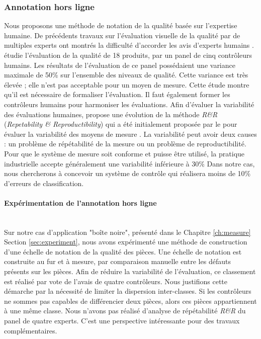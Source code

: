 \subsubsection{Annotation hors ligne}
Nous proposons une méthode de notation de la qualité basée sur l'expertise humaine.
De précédents travaux sur l'évaluation visuelle de la qualité par de multiples experts ont montrés la difficulté d'accorder les avis d'experts humains \cite{baudet_visual_2011}.
\citeauthor{baudet_visual_2011} étudie l'évaluation de la qualité de 18 produits, par un panel de cinq contrôleurs humains.
Les résultats de l'évaluation de ce panel possédaient une variance maximale de 50\% sur l'ensemble des niveaux de qualité.
Cette variance est très élevée ; elle n'est pas acceptable pour un moyen de mesure.
Cette étude montre qu'il est nécessaire de formaliser l'évaluation.
Il faut également former les contrôleurs humains pour harmoniser les évaluations.
Afin d'évaluer la variabilité des évaluations humaines,  \citeauthor{baudet_maitrise_2012} \cite{baudet_maitrise_2012} propose une évolution de la méthode \textit{R\&R} (\textit{Repetability \& Reproductibility}) qui a été initialement proposée par le \citeauthor{automotiveindustryactiongroup_measurement_2010} pour évaluer la variabilité des moyens de mesure \cite{automotiveindustryactiongroup_measurement_2010}.
La variabilité peut avoir deux causes : un problème de répétabilité de la mesure ou un problème de reproductibilité.
Pour que le système de mesure soit conforme et puisse être utilisé, la pratique industrielle accepte généralement une variabilité inférieure à 30\%
Dans notre cas, nous chercherons à concevoir un système de contrôle qui réalisera moins de 10\% d'erreurs de classification.

\paragraph{Expérimentation de l'annotation hors ligne}\mbox{} \label{parag:offline_annotation} \\
Sur notre cas d'application "boîte noire", présenté dans le Chapitre \ref{ch:measure} Section \ref{sec:experiment}, nous avons expérimenté une méthode de construction d'une échelle de notation de la qualité des pièces.
Une échelle de notation est construite au fur et à mesure, par comparaison manuelle entre les défauts présents sur les pièces.
Afin de réduire la variabilité de l'évaluation, ce classement est réalisé par vote de l'avais de quatre contrôleurs.
Nous justifions cette démarche par la nécessité de limiter la dispersion inter-classes.
Si les contrôleurs ne sommes pas capables de différencier deux pièces, alors ces pièces appartiennent à une même classe.
Nous n'avons pas réalisé d'analyse de répétabilité \textit{R\&R} du panel de quatre experts.
C'est une perspective intéressante pour des travaux complémentaires.

